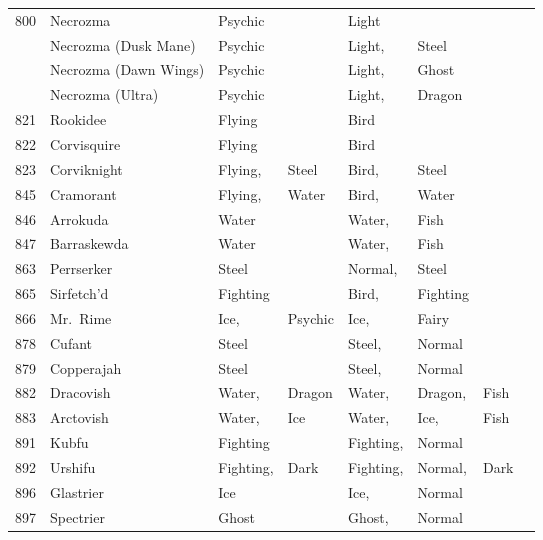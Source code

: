 \documentclass{article}
\begin{document}
\begin{longtable}{rl|ll|llll}
800 & Necrozma & Psychic &  & Light &  &  &  \\
    & Necrozma (Dusk Mane) & Psychic &  & Light, & Steel &  &  \\
    & Necrozma (Dawn Wings) & Psychic &  & Light, & Ghost &  &  \\
    & Necrozma (Ultra) & Psychic &  & Light, & Dragon &  &  \\
\hline %
821 & Rookidee & Flying &  & Bird &  &  &  \\
822 & Corvisquire & Flying &  & Bird &  &  &  \\
823 & Corviknight & Flying, & Steel & Bird, & Steel &  &  \\
845 & Cramorant & Flying, & Water & Bird, & Water &  &  \\
846 & Arrokuda & Water &  & Water, & Fish &  &  \\
847 & Barraskewda & Water &  & Water, & Fish &  &  \\
863 & Perrserker & Steel &  & Normal, & Steel &  &  \\
865 & Sirfetch'd & Fighting &  & Bird, & Fighting &  &  \\
866 & Mr.~Rime & Ice, & Psychic & Ice, & Fairy &  &  \\
878 & Cufant & Steel &  & Steel, & Normal &  &  \\
879 & Copperajah & Steel &  & Steel, & Normal &  &  \\
882 & Dracovish & Water, & Dragon & Water, & Dragon, & Fish &  \\
883 & Arctovish & Water, & Ice & Water, & Ice, & Fish &  \\
891 & Kubfu & Fighting &  & Fighting, & Normal &  &  \\
892 & Urshifu & Fighting, & Dark & Fighting, & Normal, & Dark &  \\
896 & Glastrier & Ice &  & Ice, & Normal &  &  \\
897 & Spectrier & Ghost &  & Ghost, & Normal &  &  \\
\end{longtable}

\normalsize
\end{document}
